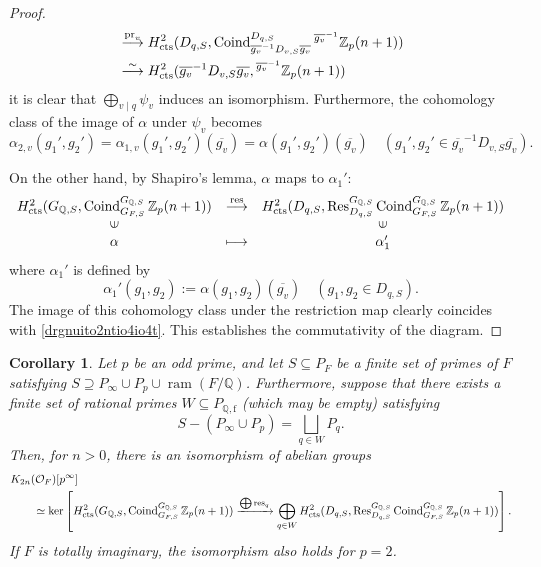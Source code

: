 \documentclass{article}
\numberwithin{equation}{section} %
\newtheorem{cor}[lemm]{Corollary}
\begin{document}
\begin{proof}
\begin{align*}
  &\overset{\mathrm{pr}_v}{\longrightarrow} H_{\rm cts}^2(D_{q,S},\operatorname{Coind}_{\overline{g_v}^{-1}D_{v,S}\overline{g_v}}^{D_{q,S}}{}^{\overline{g_v}^{-1}}\mathbb{Z}_p(n+1)) \\
  &\overset{\sim}{\longrightarrow} H_{\rm cts}^2(\overline{g_v}^{-1}D_{v,S}\overline{g_v}, {}^{\overline{g_v}^{-1}}\mathbb{Z}_p(n+1))
\end{align*}
it is clear that $\bigoplus_{v \mid q} \psi_v$ induces an isomorphism. Furthermore, the cohomology class of the image of $\alpha$ under $\psi_v$ becomes
\begin{equation}
\label{drgnuito2ntio4io4t}
  \alpha_{2,v}(g_1',g_2') = \alpha_{1,v}(g_1',g_2')(\overline{g_v}) = \alpha(g_1',g_2')(\overline{g_v}) \quad (g_1',g_2' \in \overline{g_v}^{-1}D_{v,S}\overline{g_v}).
\end{equation}

        On the other hand, by Shapiro's lemma, $\alpha$ maps to $\alpha_1'$:
\[
  \begin{array}{ccc}
H^2_{\rm cts}(G_{\mathbb{Q},S},\operatorname{Coind}_{G_{F,S}}^{G_{\mathbb{Q},S}}\mathbb{Z}_p(n+1))& \stackrel{\mathrm{res}}{\longrightarrow} &  H^2_{\rm cts}(D_{q,S},\operatorname{Res}_{D_{q,S}}^{G_{\mathbb{Q},S}}\operatorname{Coind}_{G_{F,S}}^{G_{\mathbb{Q},S}}\mathbb{Z}_p(n+1))\\
 \rotatebox{90}{$\in$} & & \rotatebox{90}{$\in$}\\
\alpha &\longmapsto  & \alpha_1'
\end{array}
\]
where $\alpha_1'$ is defined by
\[
  \alpha_1'(g_1,g_2) := \alpha(g_1,g_2)(\overline{g_v}) \quad (g_1,g_2 \in D_{q,S}).
\]
The image of this cohomology class under the restriction map clearly coincides with \eqref{drgnuito2ntio4io4t}. This establishes the commutativity of the diagram.
        
            \end{proof}

    \begin{cor}
  Let $p$ be an odd prime, and let $S \subseteq P_F$ be a finite set of primes of $F$ satisfying $S \supseteq P_\infty \cup P_p \cup \operatorname{ram}(F/\mathbb{Q})$. Furthermore, suppose that there exists a finite set of rational primes $W \subseteq P_{\mathbb{Q},\mathrm{f}}$ (which may be empty) satisfying
  \[
    S - (P_\infty \cup P_p) = \bigsqcup_{q \in W} P_q.
  \]
  Then, for $n > 0$, there is an isomorphism of abelian groups
  \begin{align*}
    &K_{2n}(\mathcal{O}_F)[p^\infty] \\
    &\qquad\simeq \operatorname{ker}\left[ H^2_{\rm cts}(G_{\mathbb{Q},S},\operatorname{Coind}_{G_{F,S}}^{G_{\mathbb{Q},S}}\mathbb{Z}_p(n+1)) \xrightarrow{\bigoplus \operatorname{res}_q} \bigoplus_{q \in W} H^2_{\rm cts}(D_{q,S},\operatorname{Res}_{D_{q,S}}^{G_{\mathbb{Q},S}}\operatorname{Coind}_{G_{F,S}}^{G_{\mathbb{Q},S}}\mathbb{Z}_p(n+1))\right].
  \end{align*}
  If $F$ is totally imaginary, the isomorphism also holds for $p=2$.
\end{cor}
\end{document}
